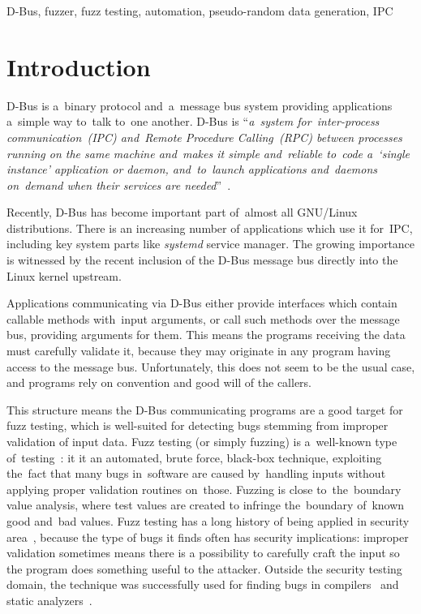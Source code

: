 \documentclass[conference]{IEEEtran}
\begin{document}
\begin{keywords}
D-Bus, fuzzer, fuzz testing, automation, pseudo-random data generation, IPC
\end{keywords}

%
\IEEEpeerreviewmaketitle



\section{Introduction}
D-Bus is a~binary protocol and~a~message bus system providing applications
a~simple way to~talk to~one another. D-Bus is ``\emph{a~system for~\mbox{inter-process}
communication~(IPC) and~Remote Procedure Calling~(RPC) between
processes running on the same machine and~makes it simple and~reliable to~code
a~`single instance' application or daemon, and~to~launch applications and~daemons
on~demand when their services are needed}''~\cite{dbus}.

Recently, D-Bus has become important part of~almost all GNU/Linux
distributions. There is an increasing number of applications which use it
for~IPC, including key system parts like \textit{systemd} service manager. The
growing importance is witnessed by the recent inclusion of the D-Bus message bus directly into the Linux kernel
upstream.

Applications communicating via D-Bus either provide interfaces which contain callable
methods with~input arguments, or call such methods over
the message bus, providing arguments for them. This means the programs
receiving the data must carefully validate it, because they may originate in
any program having access to the message bus. Unfortunately, this does not seem
to be the usual case, and programs rely on convention and good will of the
callers.

This structure means the D-Bus communicating programs are a good target for
fuzz testing, which is well-suited for detecting bugs stemming from improper
validation of input data. Fuzz testing (or simply fuzzing) is a~well-known type
of~testing~\cite{miller90-fuzz}: it it an automated, brute force, black-box
technique, exploiting the~fact that many bugs in~software are caused
by~handling inputs without applying proper validation routines on~those.
Fuzzing is close to~the~boundary value analysis, where test values are created
to infringe the~boundary of~known good and~bad values.  Fuzz testing has a long
history of being applied in security area~\cite{takanen08-book,sutton07-book},
because the type of bugs it finds often has security implications: improper
validation sometimes means there is a possibility to carefully craft the input
so the program does something useful to the attacker. Outside the security
testing domain, the technique was successfully used for finding bugs in
compilers~\cite{regehr11-compfuzz} and static analyzers~\cite{regehr12-safuzz}.
\end{document}
